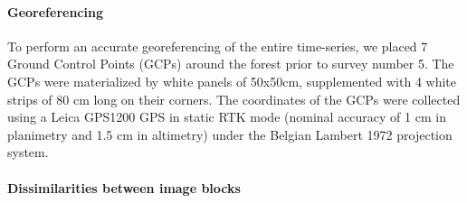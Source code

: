 \documentclass[remotesensing,article,submit,moreauthors,pdftex,12pt,a4paper]{mdpi} %
\begin{document}
\paragraph{Georeferencing}

To perform an accurate georeferencing of the entire time-series, we placed 7 Ground Control Points (GCPs) around the forest prior to survey number 5. The GCPs were materialized by white panels of 50x50cm, supplemented with 4 white strips of 80 cm long on their corners. 
The coordinates of the GCPs were collected using a Leica GPS1200 GPS in static RTK mode (nominal accuracy of 1 cm in planimetry and 1.5 cm in altimetry) under the Belgian Lambert 1972 projection system.

\paragraph{Dissimilarities between image blocks}
\end{document}
